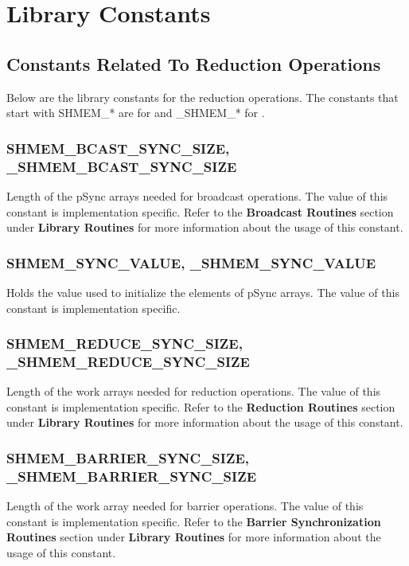 \section{Library Constants}

\subsection*{Constants Related To Reduction Operations}
Below are the library constants for the reduction operations.
The constants that start with SHMEM\_* are for \Fortran{} and 
\_SHMEM\_* for \Clang.

\subsubsection*{SHMEM\_BCAST\_SYNC\_SIZE, \_SHMEM\_BCAST\_SYNC\_SIZE}

Length of the pSync arrays needed for broadcast operations. The value
of this constant is implementation specific. Refer to the \textbf{Broadcast
Routines} section under \textbf{Library Routines} for more information
about the usage of this constant.


\subsubsection*{SHMEM\_SYNC\_VALUE, \_SHMEM\_SYNC\_VALUE}

Holds the value used to initialize the elements of pSync arrays. The
value of this constant is implementation specific.


\subsubsection*{SHMEM\_REDUCE\_SYNC\_SIZE, \_SHMEM\_REDUCE\_SYNC\_SIZE}

Length of the work arrays needed for reduction operations. The value
of this constant is implementation specific. Refer to the \textbf{Reduction
Routines} section under \textbf{Library Routines} for more information
about the usage of this constant.


\subsubsection*{SHMEM\_BARRIER\_SYNC\_SIZE, \_SHMEM\_BARRIER\_SYNC\_SIZE }

Length of the work array needed for barrier operations. The value
of this constant is implementation specific. Refer to the \textbf{Barrier
Synchronization Routines} section under \textbf{Library Routines}
for more information about the usage of this constant.


